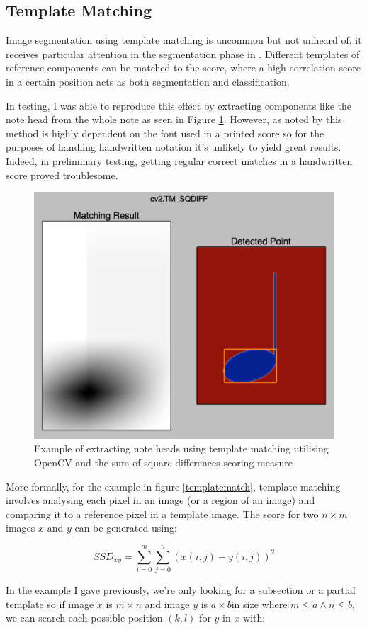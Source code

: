 \subsection{Template Matching}

Image segmentation using template matching is uncommon but not unheard of, it receives particular attention in the segmentation phase in \cite{rossant2002global}. Different templates of reference components can be matched to the score, where a high correlation score in a certain position acts as both segmentation and classification.

In testing, I was able to reproduce this effect by extracting components like the note head from the whole note as seen in Figure \ref{fig:templatematch}. However, as noted by \citeauthor{rossant2002global} this method is highly dependent on the font used in a printed score so for the purposes of handling handwritten notation it's unlikely to yield great results. Indeed, in preliminary testing, getting regular correct matches in a handwritten score proved troublesome.

\begin{figure}[h!]
  \includegraphics[width=0.6\linewidth]{gfx/template.png}
  \centering
  \caption{Example of extracting note heads using template matching utilising OpenCV and the sum of square differences scoring measure}
  \label{fig:templatematch}
\end{figure}

More formally, for the example in figure \ref{templatematch}, template matching involves analysing each pixel in an image (or a region of an image) and comparing it to a reference pixel in a template image. The score for two $n \times m$ images $x$ and $y$ can be generated using:

$$SSD_{xy} = \sum_{i = 0}^m \sum_{j = 0}^n (x(i, j) - y(i, j))^2$$

In the example I gave previously, we're only looking for a subsection or a partial template so if image $x$ is $m \times n$ and image $y$ is $a \times b$in size where $m \le a \land n \le b$, we can search each possible position $(k, l)$ for $y$ in $x$ with:

